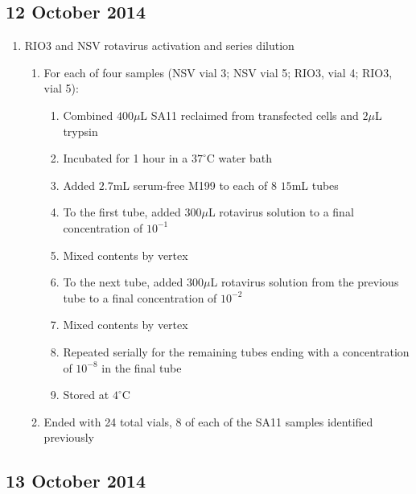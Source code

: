 
\subsection*{12 October 2014}

\begin{enumerate}
	\item RIO3 and NSV rotavirus activation and series dilution
		\begin{enumerate}
			\item For each of four samples (NSV vial 3; NSV vial 5; RIO3, vial 4; RIO3, vial 5):
				\begin{enumerate}
					\item Combined $400\mu$L SA11 reclaimed from transfected cells and $2\mu$L trypsin
					\item Incubated for 1 hour in a $37^{\circ}$C water bath
					\item Added $2.7$mL serum-free M199 to each of 8 $15$mL tubes
					\item To the first tube, added $300\mu$L rotavirus solution to a final concentration of $10^{-1}$
					\item Mixed contents by vertex
					\item To the next tube, added $300\mu$L rotavirus solution from the previous tube to a final concentration of $10^{-2}$
					\item Mixed contents by vertex
					\item Repeated serially for the remaining tubes ending with a concentration of $10^{-8}$ in the final tube
					\item Stored at $4^{\circ}$C
				\end{enumerate}
			\item Ended with 24 total vials, 8 of each of the SA11 samples identified previously
		\end{enumerate}
\end{enumerate}

\subsection*{13 October 2014}

